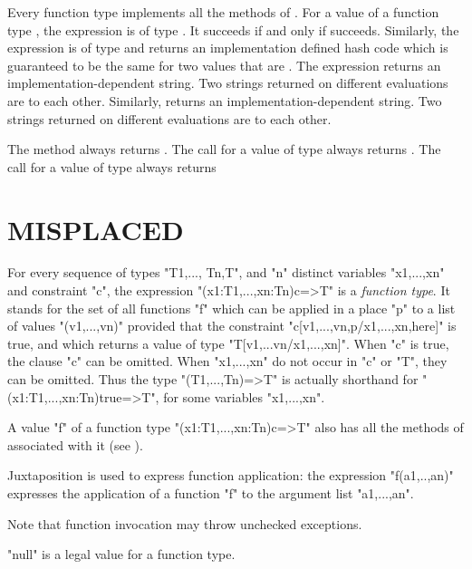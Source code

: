 Every function type implements all the methods of .
For a value  of a function type , 
the expression  is of type .
It succeeds if and only if  succeeds. Similarly, the 
expression  is of type  and returns
an implementation defined hash code which is guaranteed to be the
same for two values that are . The expression
 returns an implementation-dependent string.
Two strings returned on different evaluations are  to each other. 
Similarly,   returns an implementation-dependent string.
Two strings returned on different evaluations are  to each other. 

The method  always returns . The call
 for  a value of type  always returns
. The call 
 for  a value of type  always returns

\section{MISPLACED}

For every sequence of types \xcd"T1,..., Tn,T", and \xcd"n" distinct variables
\xcd"x1,...,xn" and constraint \xcd"c", the expression
\xcd"(x1:T1,...,xn:Tn){c}=>T" is a \emph{function type}. It stands for
 the set of all functions \xcd"f" which can be applied in a place \xcd"p" to a
 list of values \xcd"(v1,...,vn)" provided that the constraint
 \xcd"c[v1,...,vn,p/x1,...,xn,here]" is true, and which returns a value of
 type \xcd"T[v1,...vn/x1,...,xn]". When \xcd"c" is true, the clause \xcd"{c}" can be
 omitted. When \xcd"x1,...,xn" do not occur in \xcd"c" or \xcd"T", they can be
 omitted. Thus the type \xcd"(T1,...,Tn)=>T" is actually shorthand for
 \xcd"(x1:T1,...,xn:Tn){true}=>T", for some variables \xcd"x1,...,xn".


A value \xcd"f" of a function type \xcd"(x1:T1,...,xn:Tn){c}=>T" also
has all the methods of  associated with it (see ).


Juxtaposition is used to express function application: the expression
\xcd"f(a1,..,an)" expresses the application of a function \xcd"f" to the argument
list \xcd"a1,...,an".

Note that function invocation may throw unchecked exceptions. 

\xcd"null" is a legal value for a function type.
